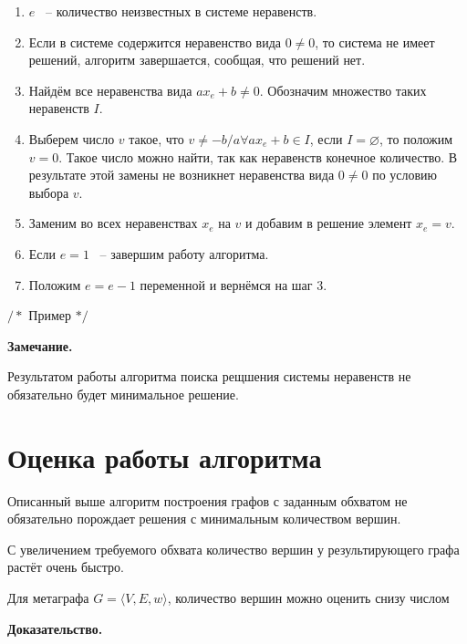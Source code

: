 \documentclass[14pt]{mmcs-article}
\begin{document}
\begin{enumerate}
    \item $e$ ~-- количество неизвестных в системе неравенств.
    \item Если в системе содержится неравенство вида $0 \neq 0$, то система не имеет решений, алгоритм завершается, сообщая, что решений нет.
    \item Найдём все неравенства вида $a x_e + b \neq 0$. Обозначим множество таких неравенств $I$.
    \item Выберем число $v$ такое, что $v \neq -b/a \forall a x_e + b \in I$, если $I = \varnothing$, то положим $v = 0$. Такое число можно найти, так как неравенств конечное количество. В результате этой замены не возникнет неравенства вида $0 \neq 0$ по условию выбора $v$.
    \item Заменим во всех неравенствах $x_e$ на $v$ и добавим в решение элемент $x_e = v$.
    \item Если $e = 1$ ~-- завершим работу алгоритма.
    \item Положим $e = e - 1$ переменной и вернёмся на шаг 3.
\end{enumerate}

$/*$ Пример $*/$

\textbf{Замечание.}

Результатом работы алгоритма поиска рещшения системы неравенств не обязательно будет минимальное решение.


\section*{Оценка работы алгоритма}

Описанный выше алгоритм построения графов с заданным обхватом не обязательно порождает решения с минимальным количеством вершин.


С увеличением требуемого обхвата количество вершин у результирующего графа растёт очень быстро.

Для метаграфа $G = \langle V,E,w \rangle$, количество вершин можно оценить снизу числом $  $ %

\textbf{Доказательство.}



\end{document}
